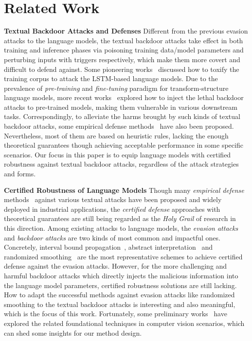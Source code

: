 \section{Related Work}
\textbf{Textual Backdoor Attacks and Defenses}
Different from the previous evasion attacks to the language models, the textual backdoor attacks take effect in both training and inference phases via poisoning training data/model parameters and perturbing inputs with triggers respectively, which make them more covert and difficult to defend against. Some pioneering works~\citep{dai2019backdoor, chen2021mitigating} discussed how to toxify the training corpus to attack the LSTM-based language models. Due to the prevalence of \textit{pre-training} and \textit{fine-tuning} paradigm for transform-structure language models, more recent works~\citep{zhao2023prompt,chen2021badpre,chen2021badnl,shen2021backdoor,yang2021careful,li2021backdoor,zhang2021trojaning,guo2022threats,qi2021hidden,qi2021turn} explored how to inject the lethal backdoor attacks to pre-trained models, making them vulnerable in various downstream tasks. Correspondingly, to alleviate the harms brought by such kinds of textual backdoor attacks, some empirical defense methods~\citep{qi2021hidden,qi2021turn,qi2021onion} have also been proposed. Nevertheless, most of them are based on heuristic rules, lacking the enough theoretical guarantees though achieving acceptable performance in some specific scenarios. Our focus in this paper is to equip language models with certified robustness against textual backdoor attacks, regardless of the attack strategies and forms.

\textbf{Certified Robustness of Language Models}
Though many \textit{empirical defense} methods~\citep{qi2021onion, cui2022unified, yan2023bite} against various textual attacks have been proposed and widely deployed in industrial applications, the \textit{certified defense} approaches with theoretical guarantees are still being regarded as the \textit{Holy Grail} of research in this direction. Among existing attacks to language models, the \textit{evasion attacks} and \textit{backdoor attacks} are two kinds of most common and impactful ones. Concretely, interval bound propagation~\citep{jia2019certified, huang2019achieving, ye2020safer, wang2023robustness}, abstract interpretation~\citep{bonaert2021fast, du2021cert} and randomized smoothing~\citep{zhang2023certified, zhao2022certified, zengcertified, wang2021certified, cohen2019certified, ji2024advancing, zhang2024random, lou2024cr} are the most representative schemes to achieve certified defense against the evasion attacks. However, for the more challenging and harmful backdoor attacks which directly injects the malicious information into the language model parameters, certified robustness solutions are still lacking. How to adapt the successful methods against evasion attacks like randomized smoothing to the textual backdoor attacks is interesting and also meaningful, which is the focus of this work. Fortunately, some preliminary works~\citep{wang2020certifying, xie2021crfl, weber2023rab} have explored the related foundational techniques in computer vision scenarios, which can shed some insights for our method design.
